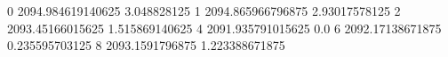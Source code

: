 0 2094.984619140625 3.048828125
1 2094.865966796875 2.93017578125
2 2093.45166015625 1.515869140625
4 2091.935791015625 0.0
6 2092.17138671875 0.235595703125
8 2093.1591796875 1.223388671875
